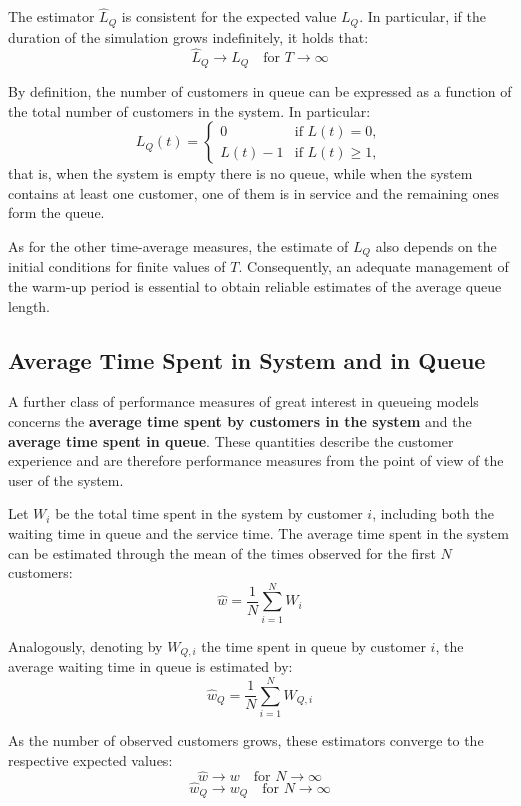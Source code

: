 The estimator $\hat{L}_Q$ is consistent for the expected value $L_Q$. In particular, if the duration of the simulation grows indefinitely, it holds that:
\[
\hat{L}_Q \longrightarrow L_Q \quad \text{for } T \to \infty
\]

By definition, the number of customers in queue can be expressed as a function of the total number of customers in the system. In particular:
\[
L_Q(t) =
\begin{cases}
0 & \text{if } L(t) = 0, \\
L(t) - 1 & \text{if } L(t) \geq 1,
\end{cases}
\]
that is, when the system is empty there is no queue, while when the system contains at least one customer, one of them is in service and the remaining ones form the queue.

As for the other time-average measures, the estimate of $L_Q$ also depends on the initial conditions for finite values of $T$. Consequently, an adequate management of the warm-up period is essential to obtain reliable estimates of the average queue length.

\subsection{Average Time Spent in System and in Queue}

A further class of performance measures of great interest in queueing models concerns the \textbf{average time spent by customers in the system} and the \textbf{average time spent in queue}. These quantities describe the customer experience and are therefore performance measures from the point of view of the user of the system.

Let $W_i$ be the total time spent in the system by customer $i$, including both the waiting time in queue and the service time. The average time spent in the system can be estimated through the mean of the times observed for the first $N$ customers:
\[
\hat{w} = \frac{1}{N} \sum_{i=1}^{N} W_i
\]

Analogously, denoting by $W_{Q,i}$ the time spent in queue by customer $i$, the average waiting time in queue is estimated by:
\[
\hat{w}_Q = \frac{1}{N} \sum_{i=1}^{N} W_{Q,i}
\]

As the number of observed customers grows, these estimators converge to the respective expected values:
\[
\hat{w} \longrightarrow w \quad \text{for } N \to \infty
\]
\[
\hat{w}_Q \longrightarrow w_Q \quad \text{for } N \to \infty
\]

